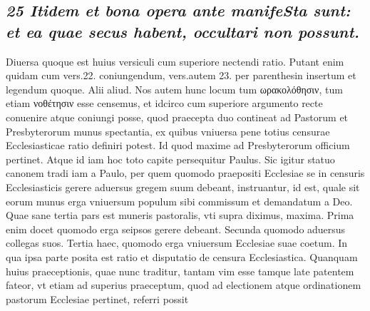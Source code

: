 \documentclass{article}
\begin{document}
\begin{pages}
\subsection*{\textit{25 Itidem et bona opera ante manifeSta sunt: et ea quae secus habent, occultari non possunt. }}\pstart Diuersa quoque est huius versiculi cum superiore nectendi ratio. Putant enim quidam cum vers.22. coniungendum, vers.autem 23. per parenthesin insertum et legendum quoque. Alii aliud. Nos autem hunc locum tum ωρακολόθησιν, tum etiam νοθέτησιν esse censemus, et idcirco cum superiore argumento recte conuenire atque coniungi posse, quod praecepta duo contineat ad Pastorum et Presbyterorum munus spectantia, ex quibus vniuersa pene totius censurae Ecclesiasticae ratio definiri potest. Id quod maxime ad Presbyterorum officium pertinet. Atque id iam hoc toto capite persequitur Paulus. Sic igitur statuo canonem tradi iam a Paulo, per quem quomodo praepositi Ecclesiae se in censuris Ecclesiasticis gerere aduersus gregem suum debeant, instruantur, id est, quale sit eorum munus erga vniuersum populum sibi commissum et demandatum a Deo. Quae sane tertia pars est muneris pastoralis, vti supra diximus, maxima. Prima enim docet quomodo erga seipsos gerere debeant. Secunda quomodo aduersus collegas suos. Tertia haec, quomodo erga vniuersum Ecclesiae suae coetum. In qua ipsa parte posita est ratio et disputatio de censura Ecclesiastica. Quanquam huius praeceptionis, quae nunc traditur, tantam vim esse tamque late patentem fateor, vt etiam ad superius praeceptum, quod ad electionem atque ordinationem pastorum Ecclesiae pertinet, referri possit  \pend

\end{pages}
\end{document}
